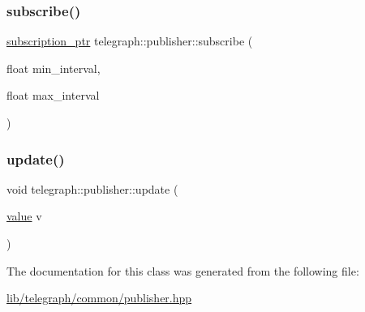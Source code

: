 \mbox{\label{classtelegraph_1_1publisher_a9ecf7dc2e9366618be852b04485a00eb}} 
\subsubsection{\texorpdfstring{subscribe()}{subscribe()}}
{\footnotesize\ttfamily \hyperlink{namespacetelegraph_a58641aa5b1a2cbdb0431916a87069f64}{subscription\+\_\+ptr} telegraph\+::publisher\+::subscribe (\begin{DoxyParamCaption}\item[{float}]{min\+\_\+interval,  }\item[{float}]{max\+\_\+interval }\end{DoxyParamCaption})\hspace{0.3cm}{\ttfamily [inline]}}

\mbox{\label{classtelegraph_1_1publisher_afe6033c401deb3af2a849e5059def250}} 
\subsubsection{\texorpdfstring{update()}{update()}}
{\footnotesize\ttfamily void telegraph\+::publisher\+::update (\begin{DoxyParamCaption}\item[{\hyperlink{classtelegraph_1_1value}{value}}]{v }\end{DoxyParamCaption})\hspace{0.3cm}{\ttfamily [inline]}}



The documentation for this class was generated from the following file\+:\begin{DoxyCompactItemize}
\item 
\hyperlink{lib_2telegraph_2common_2publisher_8hpp}{lib/telegraph/common/publisher.\+hpp}\end{DoxyCompactItemize}
